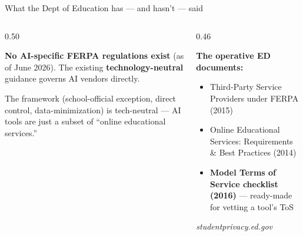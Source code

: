 \documentclass[aspectratio=169, 10pt]{beamer}
\newcommand{\cmcite}[1]{{\scriptsize\color{CoolGray}\textit{#1}}}
\begin{document}
\appendix

\begin{frame}{What the Dept of Education has --- and hasn't --- said}
\begin{columns}[T]
\begin{column}{0.50\textwidth}
\begin{tcolorbox}[keybox, title={\faGavel\quad No AI-specific rules}]
\small \textbf{No AI-specific FERPA regulations exist} (as of June 2026). The existing \textbf{technology-neutral} guidance governs AI vendors directly.
\end{tcolorbox}
\vskip4pt
\begin{tcolorbox}[quotebox, top=3pt, bottom=3pt]
\scriptsize The framework (school-official exception, direct control, data-minimization) is tech-neutral --- AI tools are just a subset of ``online educational services.''
\end{tcolorbox}
\end{column}
\begin{column}{0.46\textwidth}
\begin{tcolorbox}[accentbox]
\small
\textbf{The operative ED documents:}
\vskip3pt
\begin{itemize}\setlength{\itemsep}{2pt}
  \item Third-Party Service Providers under FERPA (2015)
  \item Online Educational Services: Requirements \& Best Practices (2014)
  \item \textbf{Model Terms of Service checklist (2016)} --- ready-made for vetting a tool's ToS
\end{itemize}
\end{tcolorbox}
\vskip3pt
\cmcite{studentprivacy.ed.gov}
\end{column}
\end{columns}
\end{frame}
\end{document}
